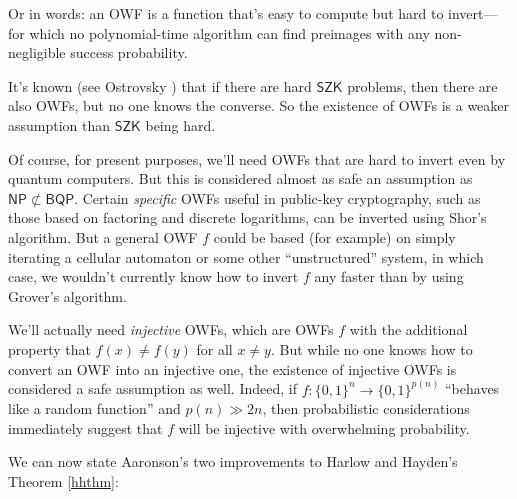 \documentclass[11pt]{report}
\theoremstyle{plain}
\theoremstyle{definition}
\begin{document}
Or in words: an OWF is a function that's easy to compute but hard to invert---for which no polynomial-time algorithm can find preimages with any non-negligible success probability.

It's known (see Ostrovsky \cite{Ost91}) that if there are hard $\mathsf{SZK}$ problems, then there are also OWFs, but no one knows the converse.  So the existence of OWFs is a weaker assumption than $\mathsf{SZK}$ being hard.

Of course, for present purposes, we'll need OWFs that are hard to invert even by quantum computers.  But this is considered almost as safe an assumption as $\mathsf{NP}\not\subset \mathsf{BQP}$.  Certain {\em specific} OWFs useful in public-key cryptography, such as those based on factoring and discrete logarithms, can be inverted using Shor's algorithm.  But a general OWF $f$ could be based (for example) on simply iterating a cellular automaton or some other ``unstructured'' system, in which case, we wouldn't currently know how to invert $f$ any faster than by using Grover's algorithm.

We'll actually need {\em injective} OWFs, which are OWFs $f$ with the additional property that $f(x)\neq f(y)$ for all $x\neq y$.  But while no one knows how to convert an OWF into an injective one, the existence of injective OWFs is considered a safe assumption as well.  Indeed, if $f:\{0,1\}^n\longrightarrow \{0,1\}^{p(n)}$ ``behaves like a random function'' and $p(n) \gg 2n$, then probabilistic considerations immediately suggest that $f$ will be injective with overwhelming probability.

We can now state Aaronson's two improvements to Harlow and Hayden's Theorem \ref{hhthm}:
\end{document}
